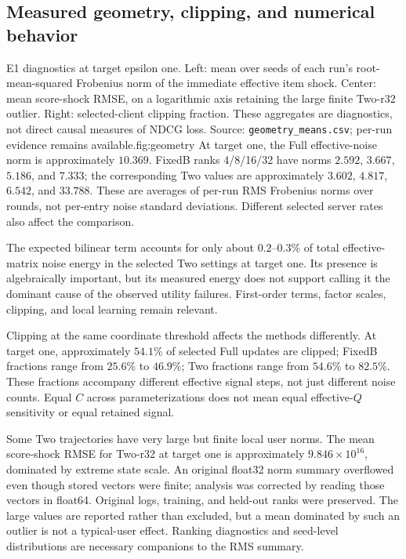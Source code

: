 \subsection{Measured geometry, clipping, and numerical behavior}
{E1 diagnostics at target epsilon one. Left: mean over seeds of each run's
root-mean-squared Frobenius norm of the immediate effective item shock.
Center: mean score-shock RMSE, on a logarithmic axis retaining the large finite
Two-r32 outlier. Right: selected-client clipping fraction. These aggregates
are diagnostics, not direct causal measures of NDCG loss. Source:
\texttt{geometry\_means.csv}; per-run evidence remains available.}{fig:geometry}
At target one, the Full effective-noise norm is approximately $10.369$.
FixedB ranks 4/8/16/32 have norms $2.592$, $3.667$, $5.186$, and $7.333$;
the corresponding Two values are approximately $3.602$, $4.817$, $6.542$,
and $33.788$. These are averages of per-run RMS Frobenius norms over rounds,
not per-entry noise standard deviations. Different selected server rates
also affect the comparison.

The expected bilinear term accounts for only about $0.2$--$0.3$\% of total
effective-matrix noise energy in the selected Two settings at target one.
Its presence is algebraically important, but its measured energy does not
support calling it the dominant cause of the observed utility failures.
First-order terms, factor scales, clipping, and local learning remain relevant.

Clipping at the same coordinate threshold affects the methods differently.
At target one, approximately $54.1$\% of selected Full updates are clipped;
FixedB fractions range from $25.6$\% to $46.9$\%; Two fractions range from
$54.6$\% to $82.5$\%. These fractions accompany different effective signal
steps, not just different noise counts. Equal $C$ across parameterizations
does not mean equal effective-$Q$ sensitivity or equal retained signal.

Some Two trajectories have very large but finite local user norms. The mean
score-shock RMSE for Two-r32 at target one is approximately
$9.846\times10^{16}$, dominated by extreme state scale. An original float32
norm summary overflowed even though stored vectors were finite; analysis
was corrected by reading those vectors in float64. Original logs, training,
and held-out ranks were preserved. The large values are reported rather
than excluded, but a mean dominated by such an outlier is not a typical-user
effect. Ranking diagnostics and seed-level distributions are necessary
companions to the RMS summary.

